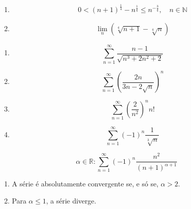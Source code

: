 \documentclass[11pt, a4paper]{article}
\begin{document}
\begin{enumerate}[label=\arabic{section}.\arabic*.]
	\item
		\begin{equation}
			0 < (n + 1)^\frac{1}{4}-n^\frac{1}{4}\leq n^{-\frac{3}{4}}, \quad
			n \in \mathbb{N}
		\end{equation}
	\item
		\begin{align*}
			\lim_{n} \left(\sqrt[4]{n + 1}-\sqrt[4]{n}\right)
		\end{align*}
\end{enumerate}


\begin{enumerate}[label=\arabic{section}.\arabic*.]
	\item
		\begin{equation}
			\sum_{n=1}^{\infty} \frac{n - 1}{\sqrt{n^3 + 2n^2 + 2}}
		\end{equation}
	\item
		\begin{equation}
			\sum_{n=1}^{\infty} \left(\frac{2n}{3n -2\sqrt{n}}\right)^n
		\end{equation}
	\item
		\begin{equation}
			\sum_{n=1}^{\infty} \left(\frac{2}{n^2}\right)^n n!
		\end{equation}
	\item
		\begin{equation}
			\sum_{n=1}^{\infty} (-1)^n \frac{1}{\sqrt[3]{n}}
		\end{equation}
\end{enumerate}

\clearpage


\begin{equation}
	\alpha \in \mathbb{R}: \sum_{n=1}^{\infty}
	(-1)^n \frac{n^2}{(n + 1)^{\alpha + 1}}
\end{equation}

\begin{enumerate}[label=\arabic{section}.\arabic*.]
	\item
		\begin{proposition}
			A série é absolutamente convergente se, e só se, $\alpha > 2$.
		\end{proposition}
	\item
		\begin{proposition}
			Para $\alpha \leq 1$, a série diverge.
		\end{proposition}
\end{enumerate}
\end{document}
